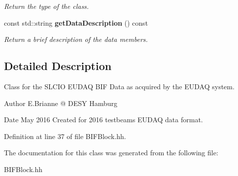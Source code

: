 \begin{DoxyCompactItemize}
\begin{DoxyCompactList}\small\item\em Return the type of the class. \end{DoxyCompactList}\item 
const std\-::string {\bf get\-Data\-Description} () const \label{classCALICE_1_1BIFBlock_a103f8aa8e9bc3073acfd2adb865342f0}

\begin{DoxyCompactList}\small\item\em Return a brief description of the data members. \end{DoxyCompactList}\end{DoxyCompactItemize}


\subsection{Detailed Description}
Class for the S\-L\-C\-I\-O E\-U\-D\-A\-Q B\-I\-F Data as acquired by the E\-U\-D\-A\-Q system. 

\begin{DoxyAuthor}{Author}
E.\-Brianne @ D\-E\-S\-Y Hamburg 
\end{DoxyAuthor}
\begin{DoxyDate}{Date}
May 2016 Created for 2016 testbeams E\-U\-D\-A\-Q data format. 
\end{DoxyDate}


Definition at line 37 of file B\-I\-F\-Block.\-hh.



The documentation for this class was generated from the following file\-:\begin{DoxyCompactItemize}
\item 
B\-I\-F\-Block.\-hh\end{DoxyCompactItemize}
